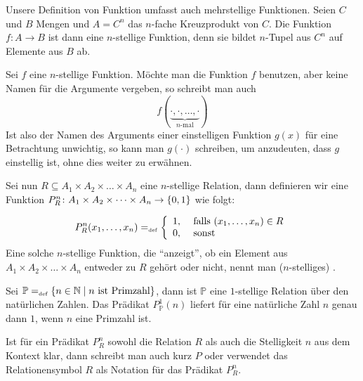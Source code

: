 \begin{remark}
Unsere Definition von Funktion umfasst auch mehrstellige
Funktionen. Seien $C$ und $B$ Mengen und $A = C^n$ das $n$-fache
Kreuzprodukt von $C$. Die Funktion $f \colon A \rightarrow B$ ist dann
eine $n$-stellige Funktion, denn sie bildet $n$-Tupel aus $C^n$ auf Elemente
aus $B$ ab.
\end{remark}

\begin{definition}
Sei $f$ eine $n$-stellige Funktion. Möchte man die Funktion $f$
benutzen, aber keine Namen für die Argumente vergeben, so
schreibt man auch 
\begin{displaymath}
f(\underbrace{\cdot, \cdot, \ldots , \cdot}_{\text{$n$-mal}})
\end{displaymath}
Ist also der Namen des Arguments einer einstelligen Funktion $g(x)$
für eine Betrachtung unwichtig, so kann man
$g(\cdot)$  schreiben, um anzudeuten, dass $g$
einstellig ist, ohne dies weiter zu erwähnen.
\end{definition}

\begin{definition}
\label{def:praedikat}
Sei nun $R \subseteq A_1 \times A_2 \times \dots \times A_n$ eine
$n$-stellige Relation, dann definieren wir eine Funktion $P^n_R \colon A_1 \times
A_2 \times \dots \times A_n \rightarrow \{0,1\}$ wie folgt:

\begin{displaymath}
P^n_R({x_{1}}, \allowbreak \dots , \allowbreak{x_{n}}) =_{\mathrm{\scriptscriptstyle def}} 
\left\{
\begin{array}{rl}
1,& \text{ falls $({x_{1}}, \allowbreak \dots , \allowbreak{x_{n}}) \in R$}\\
0,& \text{ sonst} 
\end{array}
\right.
\end{displaymath}
Eine solche $n$-stellige Funktion, die "`anzeigt"', ob ein Element 
aus $A_1 \times A_2 \times \dots \times A_n$ entweder zu $R$ gehört 
oder nicht, nennt man ($n$-stelliges) .
\end{definition}

\begin{example}
Sei $\mathbb{P} =_{\mathrm{\scriptscriptstyle def}} \{n \in \mathbb N \mid \text{$n$ ist Primzahl}\}$, dann
ist $\mathbb{P}$ eine $1$-stellige Relation über den natürlichen Zahlen. 
Das Prädikat $P^1_{\mathbb{P}}(n)$ liefert für eine natürliche Zahl
$n$ genau dann $1$, wenn $n$ eine Primzahl ist.
\end{example}

Ist für ein Prädikat $P^n_R$ sowohl die Relation $R$ als auch die
Stelligkeit $n$ aus dem Kontext klar, dann schreibt man auch kurz $P$
oder verwendet das Relationensymbol $R$ als Notation für das Prädikat
$P^n_R$. 

